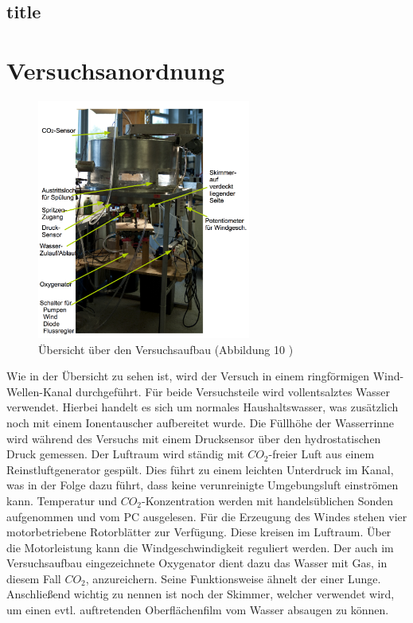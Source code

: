 \documentclass[12pt]{article}
\begin{document}
\subsection{title}









\section{Versuchsanordnung}

\begin{figure}[H]
	\centering
	\includegraphics[width=70mm]{Versuchsaufbau}
	\caption{Übersicht über den Versuchsaufbau (Abbildung 10 \cite{jaehne})}
\end{figure}

Wie in der Übersicht zu sehen ist, wird der Versuch in einem ringförmigen Wind-Wellen-Kanal durchgeführt. Für beide Versuchsteile wird vollentsalztes Wasser verwendet. Hierbei handelt es sich um normales Haushaltswasser, was zusätzlich noch mit einem Ionentauscher aufbereitet wurde. Die Füllhöhe der Wasserrinne wird während des Versuchs mit einem Drucksensor über den hydrostatischen Druck gemessen. Der Luftraum wird ständig mit $CO_2$-freier Luft aus einem Reinstluftgenerator gespült. Dies führt zu einem leichten Unterdruck im Kanal, was in der Folge dazu führt, dass keine verunreinigte Umgebungsluft einströmen kann. Temperatur und $CO_2$-Konzentration werden mit handelsüblichen Sonden aufgenommen und vom PC ausgelesen. Für die Erzeugung des Windes stehen vier motorbetriebene Rotorblätter zur Verfügung. Diese kreisen im Luftraum. Über die Motorleistung kann die Windgeschwindigkeit reguliert werden. Der auch im Versuchsaufbau eingezeichnete Oxygenator dient dazu das Wasser mit Gas, in diesem Fall $CO_2$, anzureichern. Seine Funktionsweise ähnelt der einer Lunge. Anschließend wichtig zu nennen ist noch der Skimmer, welcher verwendet wird, um einen evtl. auftretenden Oberflächenfilm vom Wasser absaugen zu können.
\end{document}
